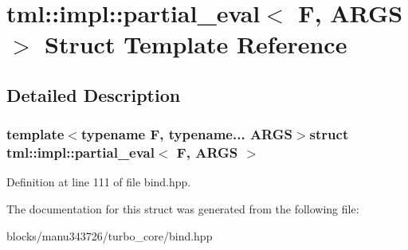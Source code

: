 \hypertarget{structtml_1_1impl_1_1partial__eval}{\section{tml\+:\+:impl\+:\+:partial\+\_\+eval$<$ F, A\+R\+G\+S $>$ Struct Template Reference}
\label{structtml_1_1impl_1_1partial__eval}
}


\subsection{Detailed Description}
\subsubsection*{template$<$typename F, typename... A\+R\+G\+S$>$struct tml\+::impl\+::partial\+\_\+eval$<$ F, A\+R\+G\+S $>$}



Definition at line 111 of file bind.\+hpp.



The documentation for this struct was generated from the following file\+:\begin{DoxyCompactItemize}
\item 
blocks/manu343726/turbo\+\_\+core/bind.\+hpp\end{DoxyCompactItemize}
